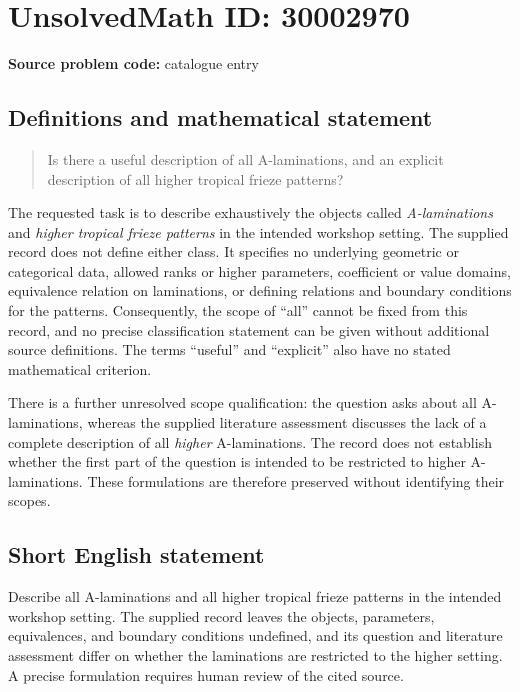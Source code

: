 \documentclass[11pt]{article}
\begin{document}
\section*{UnsolvedMath ID: 30002970}
\textbf{Source problem code:} catalogue entry
\subsection{Definitions and mathematical statement}
\begin{quote}
Is there a useful description of all A-laminations, and an explicit description of all higher tropical frieze patterns?
\end{quote}
The requested task is to describe exhaustively the objects called \emph{A-laminations} and \emph{higher tropical frieze patterns} in the intended workshop setting. The supplied record does not define either class. It specifies no underlying geometric or categorical data, allowed ranks or higher parameters, coefficient or value domains, equivalence relation on laminations, or defining relations and boundary conditions for the patterns. Consequently, the scope of ``all'' cannot be fixed from this record, and no precise classification statement can be given without additional source definitions. The terms ``useful'' and ``explicit'' also have no stated mathematical criterion.

There is a further unresolved scope qualification: the question asks about all A-laminations, whereas the supplied literature assessment discusses the lack of a complete description of all \emph{higher} A-laminations. The record does not establish whether the first part of the question is intended to be restricted to higher A-laminations. These formulations are therefore preserved without identifying their scopes.
\subsection{Short English statement}
Describe all A-laminations and all higher tropical frieze patterns in the intended workshop setting. The supplied record leaves the objects, parameters, equivalences, and boundary conditions undefined, and its question and literature assessment differ on whether the laminations are restricted to the higher setting. A precise formulation requires human review of the cited source.
\end{document}
